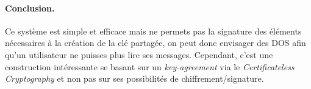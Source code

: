 \paragraph*{Conclusion.} Ce système est simple et efficace mais ne permets pas la signature des éléments nécessaires à la création de la clé partagée, on peut donc envisager des DOS afin qu'un utilisateur ne puisses plus lire ses messages. Cependant, c'est une construction intéressante se basant sur un \textit{key-agreement} via le \textit{Certificateless Cryptography} et non pas sur ses possibilités de chiffrement/signature.



